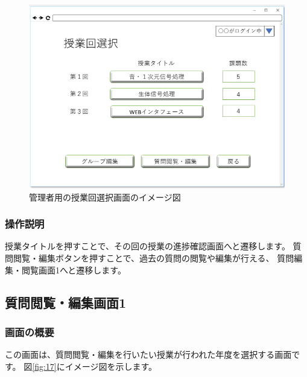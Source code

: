 \begin{figure}[htbp]
\begin{center}
  \includegraphics[width=1\linewidth,clip]{./img/16.png}
  \caption{管理者用の授業回選択画面のイメージ図}\label{fig:16}
\end{center}
\end{figure}

\subsubsection{操作説明}
授業タイトルを押すことで、その回の授業の進捗確認画面へと遷移します。
質問閲覧・編集ボタンを押すことで、過去の質問の閲覧や編集が行える、
質問編集・閲覧画面1へと遷移します。

\newpage

\subsection{質問閲覧・編集画面1}
\subsubsection{画面の概要}
この画面は、質問閲覧・編集を行いたい授業が行われた年度を選択する画面です。
図\ref{fig:17}にイメージ図を示します。

